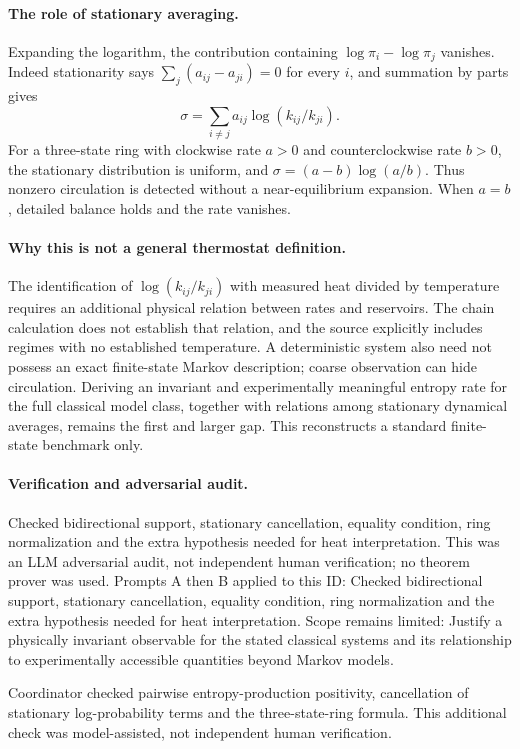 \documentclass[11pt]{article}
\begin{document}
\paragraph{The role of stationary averaging.}Expanding the logarithm, the contribution containing \(\log\pi_i-\log\pi_j\) vanishes. Indeed stationarity says \(\sum_j(a_{ij}-a_{ji})=0\) for every \(i\), and summation by parts gives
\[\sigma=\sum_{i\ne j}a_{ij}\log(k_{ij}/k_{ji}).\]
For a three-state ring with clockwise rate \(a>0\) and counterclockwise rate \(b>0\), the stationary distribution is uniform, and \(\sigma=(a-b)\log(a/b)\). Thus nonzero circulation is detected without a near-equilibrium expansion. When \(a=b\), detailed balance holds and the rate vanishes.
\paragraph{Why this is not a general thermostat definition.}The identification of \(\log(k_{ij}/k_{ji})\) with measured heat divided by temperature requires an additional physical relation between rates and reservoirs. The chain calculation does not establish that relation, and the source explicitly includes regimes with no established temperature. A deterministic system also need not possess an exact finite-state Markov description; coarse observation can hide circulation. Deriving an invariant and experimentally meaningful entropy rate for the full classical model class, together with relations among stationary dynamical averages, remains the first and larger gap. This reconstructs a standard finite-state benchmark only.

\paragraph{Verification and adversarial audit.}
Checked bidirectional support, stationary cancellation, equality condition, ring normalization and the extra hypothesis needed for heat interpretation. This was an LLM adversarial audit, not independent human verification; no theorem prover was used. Prompts A then B applied to this ID: Checked bidirectional support, stationary cancellation, equality condition, ring normalization and the extra hypothesis needed for heat interpretation. Scope remains limited: Justify a physically invariant observable for the stated classical systems and its relationship to experimentally accessible quantities beyond Markov models.

Coordinator checked pairwise entropy-production positivity, cancellation of stationary log-probability terms and the three-state-ring formula. This additional check was model-assisted, not independent human verification.
\end{document}
